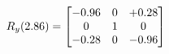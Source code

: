 \documentclass[preview]{standalone}
\begin{document}
\begin{align*}
\special{dvisvgm:raw <g id='unique000'>}R_{y}(2.86) = \begin{bmatrix}-0.96 & 0 & +0.28 \\0 & 1 & 0 \\-0.28 & 0 & -0.96\end{bmatrix}\special{dvisvgm:raw </g>}
\end{align*}
\end{document}
